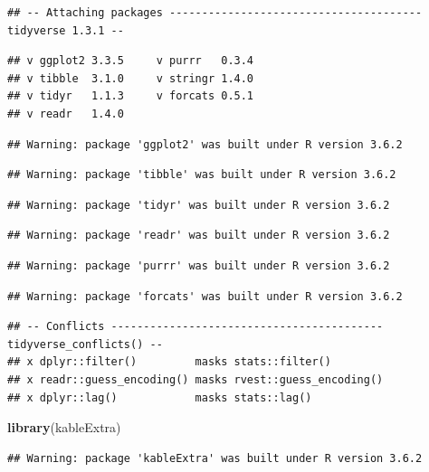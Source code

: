\documentclass[]{article}
\newenvironment{Shaded}{\begin{snugshade}}{\end{snugshade}}
\newcommand{\KeywordTok}[1]{\textcolor[rgb]{0.13,0.29,0.53}{\textbf{#1}}}
\newcommand{\NormalTok}[1]{#1}
\begin{document}
\begin{verbatim}
## -- Attaching packages --------------------------------------- tidyverse 1.3.1 --
\end{verbatim}

\begin{verbatim}
## v ggplot2 3.3.5     v purrr   0.3.4
## v tibble  3.1.0     v stringr 1.4.0
## v tidyr   1.1.3     v forcats 0.5.1
## v readr   1.4.0
\end{verbatim}

\begin{verbatim}
## Warning: package 'ggplot2' was built under R version 3.6.2
\end{verbatim}

\begin{verbatim}
## Warning: package 'tibble' was built under R version 3.6.2
\end{verbatim}

\begin{verbatim}
## Warning: package 'tidyr' was built under R version 3.6.2
\end{verbatim}

\begin{verbatim}
## Warning: package 'readr' was built under R version 3.6.2
\end{verbatim}

\begin{verbatim}
## Warning: package 'purrr' was built under R version 3.6.2
\end{verbatim}

\begin{verbatim}
## Warning: package 'forcats' was built under R version 3.6.2
\end{verbatim}

\begin{verbatim}
## -- Conflicts ------------------------------------------ tidyverse_conflicts() --
## x dplyr::filter()         masks stats::filter()
## x readr::guess_encoding() masks rvest::guess_encoding()
## x dplyr::lag()            masks stats::lag()
\end{verbatim}

\begin{Shaded}
\begin{Highlighting}[]
\KeywordTok{library}\NormalTok{(kableExtra)}
\end{Highlighting}
\end{Shaded}

\begin{verbatim}
## Warning: package 'kableExtra' was built under R version 3.6.2
\end{verbatim}
\end{document}
